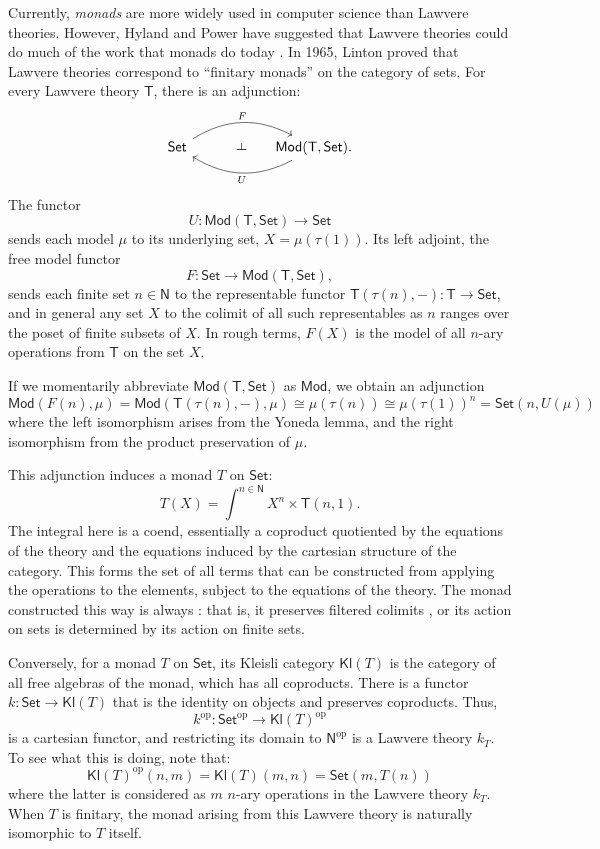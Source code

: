 \documentclass{amsart}
\newcommand{\define}[1]{{\bf \boldmath{#1}}}
\theoremstyle{definition}
\def\ld{\rotatebox[origin=c]{-90}{$\dashv$}} %
\newcommand{\Set}{\mathsf{Set}}
\newcommand{\Mod}{\mathsf{Mod}}
\newcommand{\NN}{\mathsf{N}}
\newcommand{\T}{\mathsf{T}}
\newcommand{\Kl}{\mathsf{Kl}}
\newcommand{\op}{\mathrm{op}}
\newcommand{\maps}{\colon}
\begin{document}
Currently, \textit{monads} are more widely used in computer science than Lawvere theories.  However, Hyland and Power have suggested that Lawvere theories could do much of the work that monads do today \cite{hylandpower}. In 1965, Linton \cite{linton} proved that Lawvere theories correspond to ``finitary monads'' on the category of sets.   For every Lawvere theory $\T$, there is an adjunction:
\[\begin{tikzcd}[column sep=small]
\Set \arrow[bend left,below]{rr}{F}
& {\phantom{AA} \ld} &
\arrow[bend left,above]{ll}{U} \Mod(\T,\Set).
\end{tikzcd}\]
The functor 
\[  U \maps \Mod(\T,\Set) \to \Set \]
sends each model $\mu$ to its underlying set, $X = \mu(\tau(1))$. 
Its left adjoint, the free model functor 
\[       F \maps\Set \to \Mod(\T,\Set), \]
sends each finite set $n \in \NN$ to the representable functor $\T(\tau(n),-)\maps \T \to \Set$, and in general any set $X$ to the colimit of all such representables as $n$ ranges over the poset of finite subsets of $X$.   In rough terms, $F(X)$ is the model of all $n$-ary operations from $\T$ on the set $X$.

If we momentarily abbreviate $\Mod(\T,\Set)$ as $\Mod$, we obtain an adjunction
\[   \Mod(F(n),\mu) = \Mod(\T(\tau(n),-),\mu) \cong \mu(\tau(n)) \cong \mu(\tau(1))^n = \Set(n,U(\mu))\] 
where the left isomorphism arises from the Yoneda lemma, and the right isomorphism from the product preservation of $\mu$.   

This adjunction induces a monad $T$ on $\Set$:
\begin{equation}
T(X) = \int^{n\in \NN} X^n \times \T(n,1).
\end{equation}
The integral here is a coend, essentially a coproduct quotiented by the equations of the theory and the equations induced by the cartesian structure of the category. This forms the set of all terms that can be constructed from applying the operations to the elements, subject to the equations of the theory.  The monad constructed this way is always \define{finitary}: that is, it preserves filtered colimits \cite{adamekrosicky}, or its action on sets is determined by its action on finite sets.

Conversely, for a monad $T$ on $\Set$, its Kleisli category $\Kl(T)$ is the category of all free algebras of the monad, which has all coproducts. There is a functor $k\maps \Set \to \Kl(T)$ that is the identity on objects and preserves coproducts. Thus,
\[ k^{\op}\maps \Set^{\op} \to \Kl(T)^{\op} \]
is a cartesian functor, and restricting its domain to $\NN^{\op}$ is a Lawvere theory $k_T$. To see what this is doing, note that:
$$\Kl(T)^{\op}(n,m) = \Kl(T)(m,n) = \Set(m,T(n))$$
where the latter is considered as $m$ $n$-ary operations in the Lawvere theory $k_T$.
When $T$ is finitary, the monad arising from this Lawvere theory is naturally isomorphic to $T$ itself.
\end{document}
